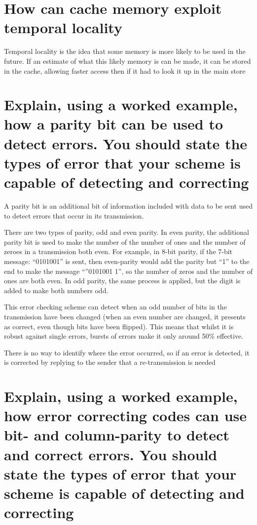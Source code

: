 \documentclass{article}
\begin{document}
\section{How can cache memory exploit temporal locality}

Temporal locality is the idea that some memory is more likely to be used in the
future. If an estimate of what this likely memory is can be made, it can be
stored in the cache, allowing faster access then if it had to look it up in the
main store


\section{Explain, using a worked example, how a parity bit can be used to detect
errors. You should state the types of error that your scheme is capable of
detecting and correcting}

A parity bit is an additional bit of information included with data to be sent
used to detect errors that occur in its transmission.

There are two types of parity, odd and even parity. In even parity, the
additional parity bit is used to make the number of the number of ones and the
number of zeroes in a transmission both even. For example, in 8-bit parity, if
the 7-bit message: ``0101001'' is sent, then even-parity would add the parity
but ``1'' to the end to make the message ``''0101001 1'', so the number of zeros
and the number of ones are both even. In odd parity, the same process is
applied, but the digit is added to make both numbers odd.

This error checking scheme can detect when an odd number of bits in the
transmission have been changed (when an even number are changed, it presents as
correct, even though bits have been flipped). This means that whilst it is
robust against single errors, bursts of errors make it only around 50\%
effective.

There is no way to identify where the error occurred, so if an error is
detected, it is corrected by replying to the sender that a re-transmission is
needed


\section{Explain, using a worked example, how error correcting codes can use
bit- and column-parity to detect and correct errors. You should state the types
of error that your scheme is capable of detecting and correcting}
\end{document}
